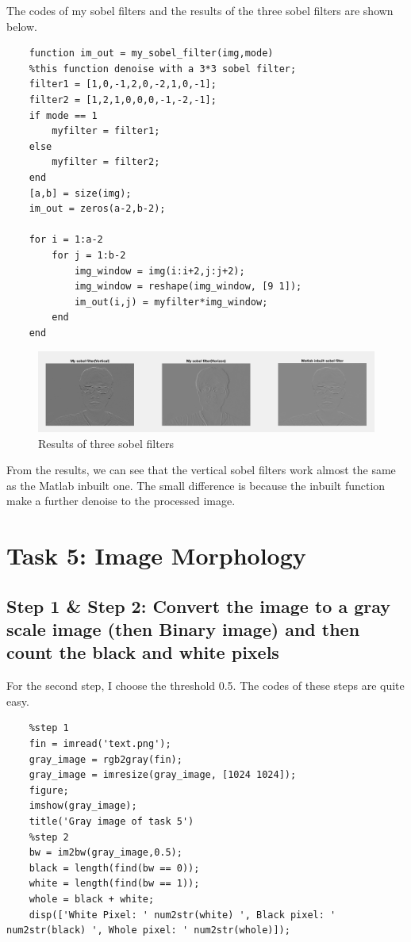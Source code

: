 \documentclass{article}
\begin{document}
The codes of my sobel filters and the results of the three sobel filters are shown below.

\begin{lstlisting}
    function im_out = my_sobel_filter(img,mode)
    %this function denoise with a 3*3 sobel filter;
    filter1 = [1,0,-1,2,0,-2,1,0,-1];
    filter2 = [1,2,1,0,0,0,-1,-2,-1];
    if mode == 1
        myfilter = filter1;
    else
        myfilter = filter2;
    end
    [a,b] = size(img);
    im_out = zeros(a-2,b-2);
    
    for i = 1:a-2
        for j = 1:b-2
            img_window = img(i:i+2,j:j+2);
            img_window = reshape(img_window, [9 1]);
            im_out(i,j) = myfilter*img_window;
        end
    end
\end{lstlisting}

\begin{figure}[htbp]
    \centering
    \includegraphics[scale = 0.3]{fig15.jpg}
    \caption{Results of three sobel filters}
    \label{fig15}
\end{figure}

From the results, we can see that the vertical sobel filters work almost the same as the Matlab inbuilt one. The small difference is because the inbuilt function make a further denoise to the processed image.

\section{Task 5: Image Morphology}
\subsection*{Step 1 \& Step 2: Convert the image to a gray scale image (then Binary image) and then count the black and white pixels}

For the second step, I choose the threshold 0.5. The codes of these steps are quite easy.

\begin{lstlisting}
    %step 1
    fin = imread('text.png');
    gray_image = rgb2gray(fin);
    gray_image = imresize(gray_image, [1024 1024]);
    figure;
    imshow(gray_image);
    title('Gray image of task 5')
    %step 2
    bw = im2bw(gray_image,0.5);
    black = length(find(bw == 0));
    white = length(find(bw == 1));
    whole = black + white;
    disp(['White Pixel: ' num2str(white) ', Black pixel: ' num2str(black) ', Whole pixel: ' num2str(whole)]);
\end{lstlisting}
\end{document}
